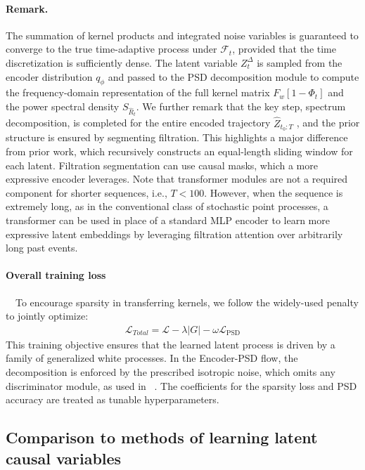 \documentclass[10pt]{article}
\numberwithin{figure}{section}
\begin{document}
\paragraph{Remark.} The summation of kernel products and integrated noise variables is guaranteed to converge to the true time-adaptive process under $\mathcal{F}_t$, provided that the time discretization is sufficiently dense. The latent variable $Z_t^{\Delta}$ is sampled from the encoder distribution $q_{\phi}$ and passed to the PSD decomposition module to compute the frequency-domain representation of the full kernel matrix $F_{w}[1 - \Phi_t]$ and the power spectral density $S_{\hat R_t}$. 
We further remark that the key step, spectrum decomposition, is completed for the entire encoded trajectory $\hat{Z}_{t_0:T}$ , and the prior structure is ensured by segmenting filtration. This highlights a major difference from prior work, which recursively constructs an equal-length sliding window for each latent. Filtration segmentation can use causal masks, which a more expressive encoder leverages.  Note that transformer modules are not a required component for shorter sequences, i.e., $T<100$. However, when the sequence is extremely long, as in the conventional class of stochastic point processes, a transformer can be used in place of a standard MLP encoder to learn more expressive latent embeddings by leveraging filtration attention over arbitrarily long past events.

\paragraph{Overall training loss}~~To encourage sparsity in transferring kernels, we follow the widely-used penalty to jointly optimize:
\begin{align}
    \mathcal{L}_{Total}= \mathcal{L}-\lambda |G|-\omega \mathcal{L}_{\mathrm{PSD}}
\end{align}
This training objective ensures that the learned latent process is driven by a family of generalized white processes. In the Encoder-PSD flow, the decomposition is enforced by the prescribed isotropic noise, which omits any discriminator module, as used in ~\cite{yao_learning_2022}. The coefficients for the sparsity loss and PSD accuracy are treated as tunable hyperparameters.

\subsection{Comparison to methods of learning latent causal variables}
\end{document}
